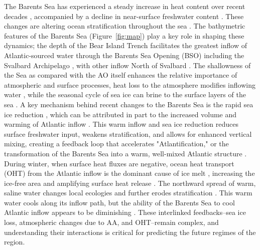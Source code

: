 \documentclass[draft]{agujournal2019}
\begin{document}
The Barents Sea has experienced a steady increase in heat content over recent decades \cite{Smedsrud2013,Bianco2024}, accompanied by a decline in near-surface freshwater content \cite{Watelet2020}. These changes are altering ocean stratification throughout the sea \cite{Lind2018,Hordoir2022}. The bathymetric features of the Barents Sea (Figure~\ref{fig:map}) play a key role in shaping these dynamics; the depth of the Bear Island Trench facilitates the greatest inflow of Atlantic-sourced water through the Barents Sea Opening (BSO) including the Svalbard Archipelago \cite{Kalhagen2024}, with other inflow North of Svalbard \cite{Lind2012,Lundesgaard2022}. The shallowness of the Sea as compared with the AO itself enhances the relative importance of atmospheric and surface processes, heat loss to the atmosphere modifies inflowing water \cite{arthun2010}, while the seasonal cycle of sea ice can brine to the surface layers of the sea \cite{schauer2002}. A key mechanism behind recent changes to the Barents Sea is the rapid sea ice reduction \cite{Rieke2023}, which can be attributed in part to the increased volume and warming of Atlantic inflow \cite{Smedsrud2010,Onarheim2018,Smedsrud2022}. This warm inflow and sea ice reduction reduces surface freshwater input, weakens stratification, and allows for enhanced vertical mixing, creating a feedback loop that accelerates "Atlantification," or the transformation of the Barents Sea into a warm, well-mixed Atlantic structure \cite{Arthun2012,Polyakov2017,Gerland2023}. During winter, when surface heat fluxes are negative, ocean heat transport (OHT) from the Atlantic inflow is the dominant cause of ice melt \cite{Ivanov2012,Tsubouchi2021}, increasing the ice-free area and amplifying surface heat release \cite{Skagseth2020}. The northward spread of warm, saline water \cite{Oziel2016} changes local ecologies \cite{Bogstad2015,Dalpadado2014,Ingvaldsen2021} and further erodes stratification \cite{Lind2018}. This warm water cools along its inflow path, but the ability of the Barents Sea to cool Atlantic inflow appears to be diminishing \cite{Shu2021,Skagseth2020}. These interlinked feedbacks--sea ice loss, atmospheric changes due to AA, and OHT--remain complex, and understanding their interactions is critical for predicting the future regimes of the region.
\end{document}
